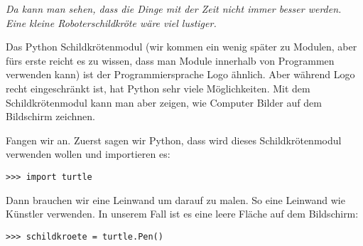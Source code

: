 \emph{Da kann man sehen, dass die Dinge mit der Zeit nicht immer besser werden. Eine kleine Roboterschildkröte wäre viel lustiger.}

Das Python Schildkrötenmodul (wir kommen ein wenig später zu Modulen, aber fürs erste reicht es zu wissen, dass man Module innerhalb von Programmen verwenden kann) ist der Programmiersprache Logo ähnlich. Aber während Logo recht eingeschränkt ist, hat Python sehr viele Möglichkeiten. Mit dem Schildkrötenmodul kann man aber zeigen, wie Computer Bilder auf dem Bildschirm zeichnen.

Fangen wir an. Zuerst sagen wir Python, dass wird dieses Schildkrötenmodul verwenden wollen und importieren es:


\begin{listing}
\begin{verbatim}
>>> import turtle
\end{verbatim}
\end{listing}

Dann brauchen wir eine Leinwand um darauf zu malen. So eine Leinwand wie Künstler verwenden. In unserem Fall ist es eine leere Fläche auf dem Bildschirm:

\begin{listing}
\begin{verbatim}
>>> schildkroete = turtle.Pen()
\end{verbatim}
\end{listing}

